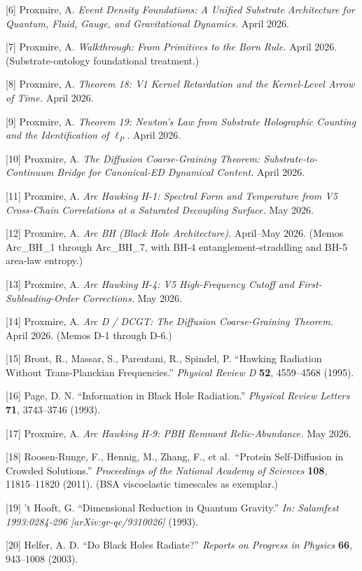 \documentclass[
  11pt,
  a4paperpaper,
]{article}
\begin{document}
{[}6{]} Proxmire, A. \emph{Event Density Foundations: A Unified
Substrate Architecture for Quantum, Fluid, Gauge, and Gravitational
Dynamics.} April 2026.

{[}7{]} Proxmire, A. \emph{Walkthrough: From Primitives to the Born
Rule.} April 2026. (Substrate-ontology foundational treatment.)

{[}8{]} Proxmire, A. \emph{Theorem 18: V1 Kernel Retardation and the
Kernel-Level Arrow of Time.} April 2026.

{[}9{]} Proxmire, A. \emph{Theorem 19: Newton's Law from Substrate
Holographic Counting and the Identification of \(\ell_P\).} April 2026.

{[}10{]} Proxmire, A. \emph{The Diffusion Coarse-Graining Theorem:
Substrate-to-Continuum Bridge for Canonical-ED Dynamical Content.} April
2026.

{[}11{]} Proxmire, A. \emph{Arc Hawking H-1: Spectral Form and
Temperature from V5 Cross-Chain Correlations at a Saturated Decoupling
Surface.} May 2026.

{[}12{]} Proxmire, A. \emph{Arc BH (Black Hole Architecture).}
April--May 2026. (Memos Arc\_BH\_1 through Arc\_BH\_7, with BH-4
entanglement-straddling and BH-5 area-law entropy.)

{[}13{]} Proxmire, A. \emph{Arc Hawking H-4: V5 High-Frequency Cutoff
and First-Subleading-Order Corrections.} May 2026.

{[}14{]} Proxmire, A. \emph{Arc D / DCGT: The Diffusion Coarse-Graining
Theorem.} April 2026. (Memos D-1 through D-6.)

{[}15{]} Brout, R., Massar, S., Parentani, R., Spindel, P. ``Hawking
Radiation Without Trans-Planckian Frequencies.'' \emph{Physical Review
D} \textbf{52}, 4559--4568 (1995).

{[}16{]} Page, D. N. ``Information in Black Hole Radiation.''
\emph{Physical Review Letters} \textbf{71}, 3743--3746 (1993).

{[}17{]} Proxmire, A. \emph{Arc Hawking H-9: PBH Remnant
Relic-Abundance.} May 2026.

{[}18{]} Roosen-Runge, F., Hennig, M., Zhang, F., et al.~``Protein
Self-Diffusion in Crowded Solutions.'' \emph{Proceedings of the National
Academy of Sciences} \textbf{108}, 11815--11820 (2011). (BSA
viscoelastic timescales as exemplar.)

{[}19{]} 't Hooft, G. ``Dimensional Reduction in Quantum Gravity.''
\emph{In: Salamfest 1993:0284-296 {[}arXiv:gr-qc/9310026{]}} (1993).

{[}20{]} Helfer, A. D. ``Do Black Holes Radiate?'' \emph{Reports on
Progress in Physics} \textbf{66}, 943--1008 (2003).
\end{document}
